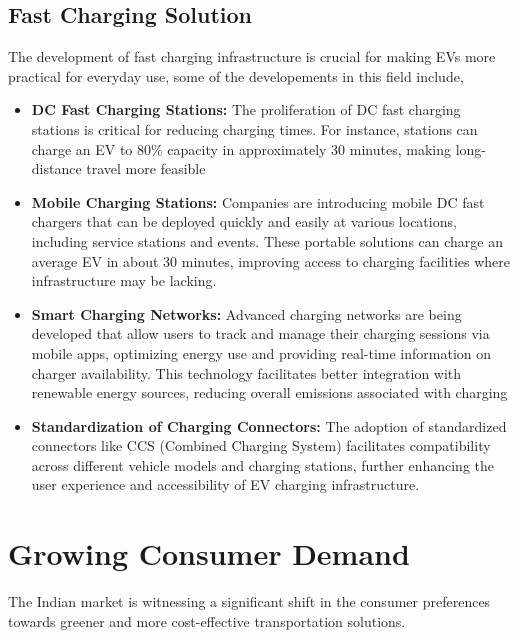 \documentclass[a4paper,12pt]{report}
\begin{document}
\subsection{Fast Charging Solution}
The development of fast charging infrastructure is crucial for making EVs more practical for everyday use, some of the developements in this field include,
\begin{itemize}
    \item \textbf{DC Fast Charging Stations: }
    The proliferation of DC fast charging stations is critical for reducing charging times. For instance, stations can charge an EV to 80\% capacity in approximately 30 minutes, making long-distance travel more feasible

    \item \textbf{Mobile Charging Stations: }
    Companies are introducing mobile DC fast chargers that can be deployed quickly and easily at various locations, including service stations and events. These portable solutions can charge an average EV in about 30 minutes, improving access to charging facilities where infrastructure may be lacking.

    \item \textbf{Smart Charging Networks: }
    Advanced charging networks are being developed that allow users to track and manage their charging sessions via mobile apps, optimizing energy use and providing real-time information on charger availability. This technology facilitates better integration with renewable energy sources, reducing overall emissions associated with charging

    \item \textbf{Standardization of Charging Connectors: }
    The adoption of standardized connectors like CCS (Combined Charging System) facilitates compatibility across different vehicle models and charging stations, further enhancing the user experience and accessibility of EV charging infrastructure. 
\end{itemize}



\section{Growing Consumer Demand}
The Indian market is witnessing a significant shift in the consumer preferences towards greener and more cost-effective transportation solutions.
\end{document}
